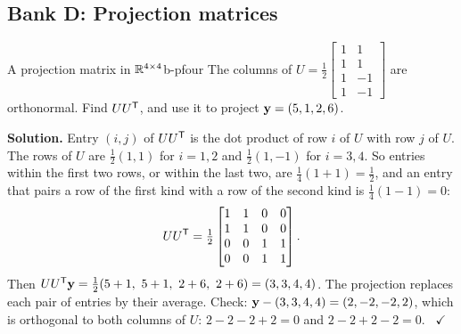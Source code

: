 \documentclass[11pt]{article}
\begin{document}
\subsection*{Bank D: Projection matrices}
\begin{exmp}{A projection matrix in $\mathbb{R}^{4\times4}$}{b-pfour}
The columns of $U=\tfrac12\begin{bmatrix}1&1\\1&1\\1&-1\\1&-1\end{bmatrix}$ are orthonormal. Find $UU^{\mathsf T}$, and use it to project $\mathbf{y}=(5,1,2,6)$.

\textbf{Solution.} Entry $(i,j)$ of $UU^{\mathsf T}$ is the dot product of row $i$ of $U$ with row $j$ of $U$. The rows of $U$ are $\tfrac12(1,1)$ for $i=1,2$ and $\tfrac12(1,-1)$ for $i=3,4$. So entries within the first two rows, or within the last two, are $\tfrac14(1+1)=\tfrac12$, and an entry that pairs a row of the first kind with a row of the second kind is $\tfrac14(1-1)=0$:
\[
UU^{\mathsf T}=\tfrac12\begin{bmatrix}1&1&0&0\\1&1&0&0\\0&0&1&1\\0&0&1&1\end{bmatrix}.
\]
Then $UU\T\bv{y}=\tfrac12(5+1,\ 5+1,\ 2+6,\ 2+6)=(3,3,4,4)$. The projection replaces each pair of entries by their average. Check: $\mathbf{y}-(3,3,4,4)=(2,-2,-2,2)$, which is orthogonal to both columns of $U$: $2-2-2+2=0$ and $2-2+2-2=0$. \ $\checkmark$
\end{exmp}
\end{document}
